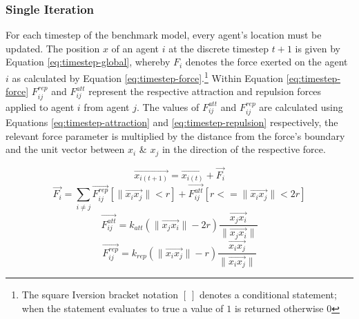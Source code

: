     \subsubsection{Single Iteration}
      For each timestep of the benchmark model, every agent's location must be updated. The position $x$ of an agent $i$ at the discrete timestep $t+1$ is given by Equation \ref{eq:timestep-global}, whereby $F_{i}$ denotes the force exerted on the agent $i$ as calculated by Equation \ref{eq:timestep-force}.\footnote{The square Iversion bracket notation $[\:]$ denotes a conditional statement; when the statement evaluates to true a value of $1$ is returned otherwise $0$} Within Equation \ref{eq:timestep-force} $F_{ij}^{rep}$ and $F_{ij}^{att}$ represent the respective attraction and repulsion forces applied to agent $i$ from agent $j$. The values of $F_{ij}^{att}$ and $F_{ij}^{rep}$ are calculated using Equations \ref{eq:timestep-attraction} and \ref{eq:timestep-repulsion} respectively, the relevant force parameter is multiplied by the distance from the force's boundary and the unit vector between $x_{i}$ \& $x_{j}$ in the direction of the respective force.
      
      \vspace{-0.3cm}
      \begin{equation}\label{eq:timestep-global}
        \overrightarrow{x_{i(t+1)}} = \overrightarrow{x_{i(t)}} + \overrightarrow{F_{i}}
      \end{equation}
      \vspace{-0.3cm}
      \begin{equation}\label{eq:timestep-force}
        \overrightarrow{F_{i}} = \sum\limits_{i \neq j} \overrightarrow{F_{ij}^{rep}}[\lVert\overrightarrow{x_{i}x_{j}}\rVert < r] + \overrightarrow{F_{ij}^{att}}[r <= \lVert\overrightarrow{x_{i}x_{j}}\rVert < 2r]
      \end{equation}
      \vspace{-0.3cm}
      \begin{equation}\label{eq:timestep-attraction}
        \overrightarrow{F_{ij}^{att}} = k_{att}(\lVert\overrightarrow{x_{j}x_{i}}\rVert-2r)\frac{\overrightarrow{x_{j}x_{i}}}{\lVert\overrightarrow{x_{j}x_{i}}\rVert}
      \end{equation} 
      \begin{equation}\label{eq:timestep-repulsion}
        \overrightarrow{F_{ij}^{rep}} = k_{rep}(\lVert\overrightarrow{x_{i}x_{j}}\rVert-r)\frac{\overrightarrow{x_{i}x_{j}}}{\lVert\overrightarrow{x_{i}x_{j}}\rVert}
      \end{equation}
      
